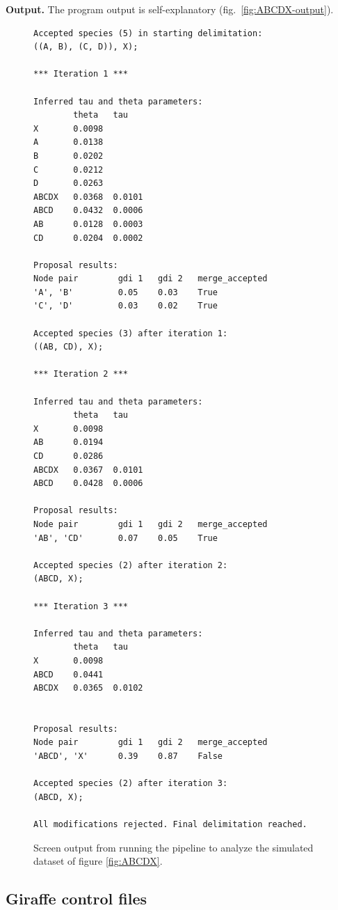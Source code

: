 \documentclass[A4]{article1}
\begin{document}
\textbf{Output.}  The program output is self-explanatory (fig.~\ref{fig:ABCDX-output}).

\begin{figure}
    \centering
    \footnotesize
    
    \begin{verbatim}
Accepted species (5) in starting delimitation:
((A, B), (C, D)), X);

*** Iteration 1 ***

Inferred tau and theta parameters:
        theta   tau
X       0.0098	
A       0.0138	
B       0.0202	
C       0.0212	
D       0.0263	
ABCDX   0.0368  0.0101
ABCD    0.0432  0.0006
AB      0.0128  0.0003
CD      0.0204  0.0002

Proposal results:
Node pair        gdi 1   gdi 2   merge_accepted
'A', 'B'         0.05    0.03    True
'C', 'D'         0.03    0.02    True

Accepted species (3) after iteration 1:
((AB, CD), X);

*** Iteration 2 ***

Inferred tau and theta parameters:
        theta   tau
X       0.0098	
AB      0.0194	
CD      0.0286	
ABCDX   0.0367  0.0101
ABCD    0.0428  0.0006

Proposal results:
Node pair        gdi 1   gdi 2   merge_accepted
'AB', 'CD'       0.07    0.05    True 

Accepted species (2) after iteration 2:
(ABCD, X);

*** Iteration 3 ***

Inferred tau and theta parameters:
        theta   tau
X       0.0098
ABCD    0.0441	
ABCDX   0.0365  0.0102


Proposal results:
Node pair        gdi 1   gdi 2   merge_accepted
'ABCD', 'X'      0.39    0.87    False

Accepted species (2) after iteration 3:
(ABCD, X);

All modifications rejected. Final delimitation reached.
    \end{verbatim}
    
    \caption{Screen output from running the pipeline to analyze the simulated dataset of
        figure \ref{fig:ABCDX}. %
    } \label{fig:ABCDX_text_out}
\end{figure}

\clearpage
\newpage
\subsection{Giraffe control files}
\end{document}
